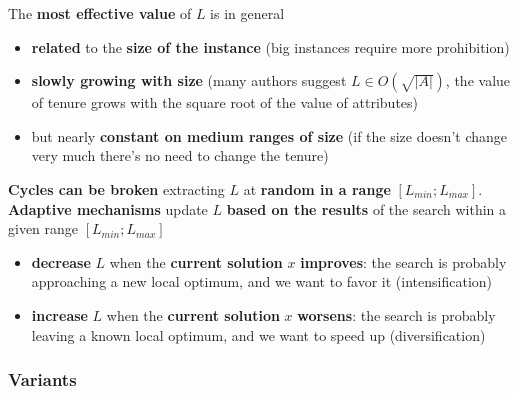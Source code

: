 The \textbf{most effective value} of $L$ is in general
\begin{itemize}
	\item \textbf{related} to the \textbf{size of the instance} (big instances require more prohibition)
	
	\item \textbf{slowly growing with size} (many authors suggest $L \in O(\sqrt{|A|})$, the value of tenure grows with the square root of the value of attributes)
	
	\item but nearly \textbf{constant on medium ranges of size} (if the size doesn't change very much there's no need to change the tenure)
\end{itemize}

\textbf{Cycles can be broken} extracting $L$ at \textbf{random in a range} $[L_{min}; L_{max}]$.\\

\nn
\textbf{Adaptive mechanisms} update $L$ \textbf{based on the results} of the search within a given range $[L_{min}; L_{max}]$
\begin{itemize}
	\item \textbf{decrease} $L$ when the \textbf{current solution} $x$ \textbf{improves}: the search is probably approaching a new local optimum, and we want to favor it (intensification)
	
	\item \textbf{increase} $L$ when the \textbf{current solution} $x$ \textbf{worsens}: the search is probably leaving a known local optimum, and we want to speed up (diversification)
\end{itemize}

\newpage

\subsubsection{Variants}

